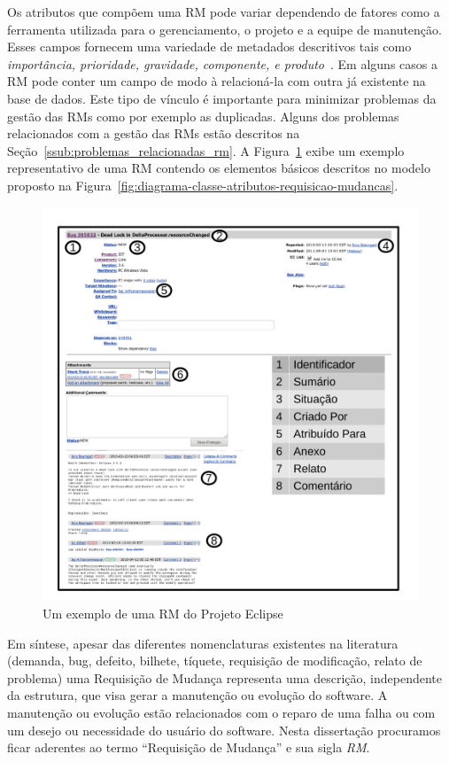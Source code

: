 Os atributos que compõem uma RM pode variar dependendo de fatores como a
ferramenta utilizada para o gerenciamento, o projeto e a equipe de manutenção.
Esses campos fornecem uma variedade de metadados descritivos tais como
\textit{importância, prioridade, gravidade, componente, e
    produto}~\cite{zhang2016literature}. Em alguns casos a RM pode conter um
campo de modo à relacioná-la com outra já existente na base de dados. Este tipo
de vínculo é importante para minimizar problemas da gestão das RMs como por
exemplo as duplicadas. Alguns dos problemas relacionados com a gestão das RMs
estão descritos na Seção~\ref{ssub:problemas_relacionadas_rm}. A
Figura~\ref{fig:rm-exemplo} exibe um exemplo representativo de uma RM contendo
os elementos básicos descritos no modelo proposto na
Figura~\ref{fig:diagrama-classe-atributos-requisicao-mudancas}.

\begin{figure}[htpb]
	\centering
	\includegraphics[width=0.8\linewidth]{./chapter-manutencao-software-visao-geral/img/rm-exemplo.pdf}
	\caption{Um exemplo de uma RM do Projeto Eclipse}
\label{fig:rm-exemplo}
\end{figure}

Em síntese, apesar das diferentes nomenclaturas existentes na literatura
(demanda, bug, defeito, bilhete, tíquete, requisição de modificação, relato de
problema) uma Requisição de Mudança representa uma descrição, independente da
estrutura, que visa gerar a manutenção ou evolução do software. A manutenção ou
evolução estão relacionados com o reparo de uma falha ou com um desejo ou
necessidade do usuário do software. Nesta dissertação procuramos ficar aderentes
ao termo ``Requisição de Mudança'' e sua sigla \textit{RM}.

